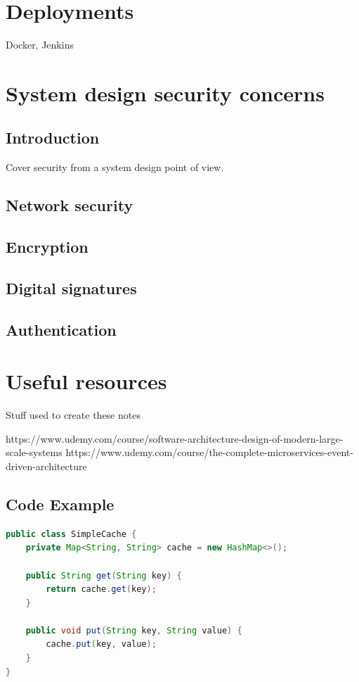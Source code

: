 \documentclass[a4paper, 11pt]{book}
\begin{document}
    \chapter{Deployments}
    Docker, Jenkins


    \chapter{System design security concerns}


    \section{Introduction}
    Cover security from a system design point of view.


    \section{Network security}


    \section{Encryption}


    \section{Digital signatures}


    \section{Authentication}


    \chapter{Useful resources}
    Stuff used to create these notes

    https://www.udemy.com/course/software-architecture-design-of-modern-large-scale-systems
    https://www.udemy.com/course/the-complete-microservices-event-driven-architecture

    \newpage



    \section{Code Example}
    \begin{lstlisting}[language=Java, caption=Java Code for a Simple Cache]
public class SimpleCache {
    private Map<String, String> cache = new HashMap<>();

    public String get(String key) {
        return cache.get(key);
    }

    public void put(String key, String value) {
        cache.put(key, value);
    }
}
    \end{lstlisting}
\end{document}
